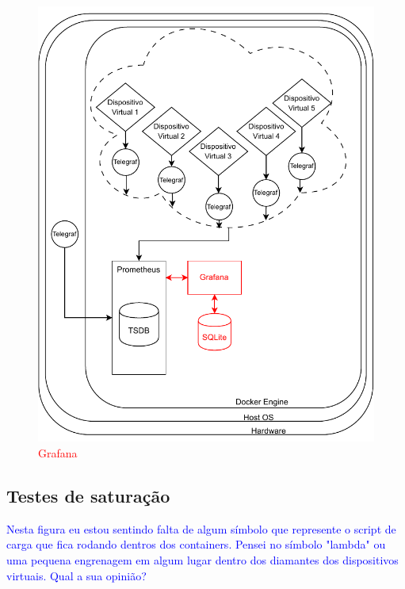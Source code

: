 {\begin{figure}[H]
\centering
\includegraphics[scale=1]{Imagens/chap03/by-blocks/grafana_diagram.pdf}
\caption{\textcolor{red}{Grafana}}
\label{fig:DiagramaGrafana}
\end{figure}


\subsection{Testes de saturação}
\label{subsection:TestesSaturacao}

\textcolor{blue}{Nesta figura eu estou sentindo falta de algum símbolo que represente o script de carga que fica rodando dentros dos containers. Pensei no símbolo "lambda" ou uma pequena engrenagem em algum lugar dentro dos diamantes dos dispositivos virtuais. Qual a sua opinião?}

}
